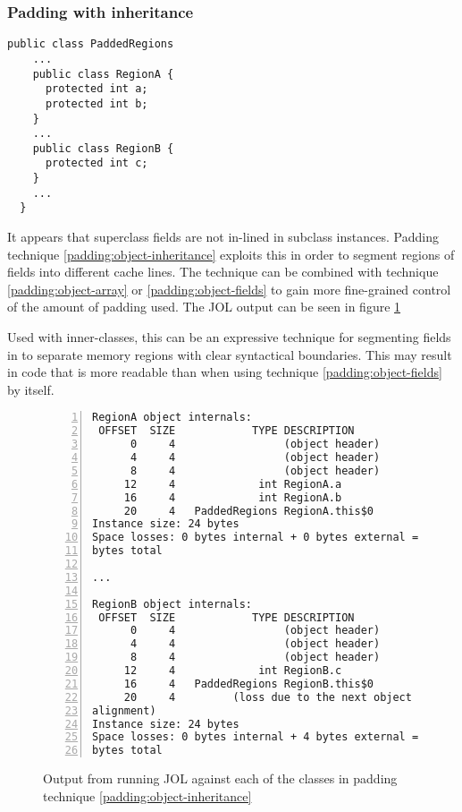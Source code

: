 \subsubsection{Padding with inheritance}

\begin{padding}[h]
\begin{Verbatim}[frame=single]
  public class PaddedRegions
    ...
    public class RegionA {
      protected int a;
      protected int b;
    }
    ...
    public class RegionB {
      protected int c;
    }
    ...
  }
\end{Verbatim}
	\caption{}
	\label{padding:object-inheritance}
\end{padding}

It appears that superclass fields are not in-lined in subclass instances.
Padding technique \ref{padding:object-inheritance} exploits this in order to
segment regions of fields into different cache lines. The technique can be
combined with technique \ref{padding:object-array} or
\ref{padding:object-fields} to gain more fine-grained control of the amount of
padding used. The JOL output can be seen in figure \ref{jol:object-inheritance}

Used with inner-classes, this can be an expressive technique for segmenting
fields in to separate memory regions with clear syntactical boundaries. This may
result in code that is more readable than when using technique
\ref{padding:object-fields} by itself.

\begin{figure}[h]
\begin{Verbatim}[frame=single, numbers=left]
RegionA object internals:
 OFFSET  SIZE            TYPE DESCRIPTION
      0     4                 (object header)
      4     4                 (object header)
      8     4                 (object header)
     12     4             int RegionA.a
     16     4             int RegionA.b
     20     4   PaddedRegions RegionA.this$0
Instance size: 24 bytes
Space losses: 0 bytes internal + 0 bytes external = 0
bytes total

...

RegionB object internals:
 OFFSET  SIZE            TYPE DESCRIPTION
      0     4                 (object header)
      4     4                 (object header)
      8     4                 (object header)
     12     4             int RegionB.c
     16     4   PaddedRegions RegionB.this$0
     20     4         (loss due to the next object
alignment)
Instance size: 24 bytes
Space losses: 0 bytes internal + 4 bytes external = 4
bytes total
\end{Verbatim}
	\caption{Output from running JOL against each of the classes in padding
	technique \ref{padding:object-inheritance}}
	\label{jol:object-inheritance}
\end{figure}

